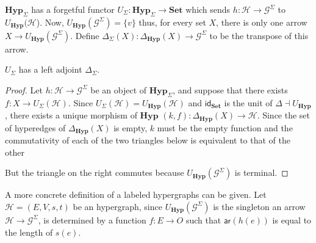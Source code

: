 \documentclass[runningheads,envcountsect]{lmcs}
\newcommand{\hyp}{\catname{Hyp}}
\newcommand{\catname}[1]{\mathbf{#1}}
\newcommand{\ari}[0]{\mathsf{ar}}
\newcommand{\id}[1]{\mathsf{id}_{#1}}
\theoremstyle{plain}
\theoremstyle{definition}
\begin{document}
$\hyp_{\Sigma}$ has a forgetful functor $U_{\Sigma}:\hyp_{\Sigma}\to \catname{Set}$ which sends $h:\mathcal{H}\to \mathcal{G}^{\Sigma}$ to $U_{\hyp}(\mathcal{H}$). Now, $U_{\hyp}(\mathcal{G}^{\Sigma})=\{v\}$ thus, for every set $X$, there is only one arrow $X\to U_{\hyp}(\mathcal{G}^{\Sigma})$. Define $\Delta_{\Sigma}(X):\Delta_{\hyp}(X)\to \mathcal{G}^{\Sigma}$ to be the transpose of this arrow.

\begin{prop} $U_\Sigma$
	has a left adjoint $\Delta_\Sigma$.
\end{prop}
\begin{proof}Let $h:\mathcal{H}\to \mathcal{G}^{\Sigma}$ be an object of $\hyp_{\Sigma}$, and suppose that there exists $f:X\to U_{\Sigma}(\mathcal{H})$. Since $U_{\Sigma}(\mathcal{H})=U_{\hyp}(\mathcal{H})$ and $\id{\catname{Set}}$ is the unit of $\Delta\dashv U_{\hyp}$, there exists a unique morphism of $\hyp$ $(k,f):\Delta_{\hyp}(X)\to \mathcal{H}$. Since the set of hyperedges of $\Delta_{\hyp}(X)$ is empty, $k$ must be the empty function and the commutativity of each of the two triangles below is equivalent to that of the other
	\begin{center}
	\end{center}
	But the triangle on the right commutes because $U_{\hyp}(\mathcal{G}^{\Sigma})$ is terminal.
\end{proof}


A more concrete definition of a labeled hypergraphs can be given. Let $\mathcal{H}=(E, V, s, t)$ be an hypergraph, since  $U_{\hyp}(\mathcal{G}^{\Sigma})$ is the singleton an arrow $\mathcal{H}\rightarrow \mathcal{G}^{\Sigma}$, is determined by a function $f:E\to O$  such that $\ari(h(e))$ is equal to the length of $s(e)$. 
\end{document}
